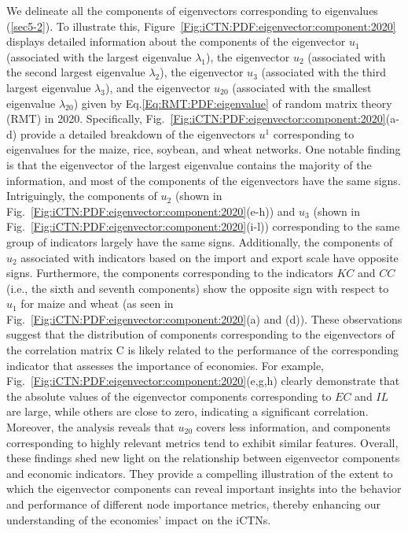 \documentclass[preprint,3p,times,sort&compress]{elsarticle}
\begin{document}
We delineate all the components of eigenvectors corresponding to eigenvalues (\ref{sec5-2}). To illustrate this, Figure~\ref{Fig:iCTN:PDF:eigenvector:component:2020} displays detailed information about the components of the eigenvector $u_1$ (associated with the largest eigenvalue $\lambda_1$), the eigenvector $u_2$ (associated with the second largest eigenvalue $\lambda_2$), the eigenvector $u_3$ (associated with the third largest eigenvalue $\lambda_3$), and the eigenvector $u_{20}$ (associated with the smallest eigenvalue $\lambda_{20}$) given by Eq.\ref{Eq:RMT:PDF:eigenvalue} of random matrix theory (RMT) in 2020. Specifically, Fig.~\ref{Fig:iCTN:PDF:eigenvector:component:2020}(a-d) provide a detailed breakdown of the eigenvectors $u^1$ corresponding to eigenvalues for the maize, rice, soybean, and wheat networks. One notable finding is that the eigenvector of the largest eigenvalue contains the majority of the information, and most of the components of the eigenvectors have the same signs. Intriguingly, the components of $u_2$ (shown in Fig.~\ref{Fig:iCTN:PDF:eigenvector:component:2020}(e-h)) and $u_3$ (shown in Fig.~\ref{Fig:iCTN:PDF:eigenvector:component:2020}(i-l)) corresponding to the same group of indicators largely have the same signs. Additionally, the components of $u_2$ associated with indicators based on the import and export scale have opposite signs. Furthermore, the components corresponding to the indicators $KC$ and $CC$ (i.e., the sixth and seventh components) show the opposite sign with respect to $u_1$ for maize and wheat (as seen in Fig.~\ref{Fig:iCTN:PDF:eigenvector:component:2020}(a) and (d)). These observations suggest that the distribution of components corresponding to the eigenvectors of the correlation matrix $\mathrm{C}$ is likely related to the performance of the corresponding indicator that assesses the importance of economies. For example, Fig.~\ref{Fig:iCTN:PDF:eigenvector:component:2020}(e,g,h) clearly demonstrate that the absolute values of the eigenvector components corresponding to $EC$ and $IL$ are large, while others are close to zero, indicating a significant correlation. Moreover, the analysis reveals that $u_{20}$ covers less information, and components corresponding to highly relevant metrics tend to exhibit similar features. Overall, these findings shed new light on the relationship between eigenvector components and economic indicators. They provide a compelling illustration of the extent to which the eigenvector components can reveal important insights into the behavior and performance of different node importance metrics, thereby enhancing our understanding of the economies' impact on the iCTNs.
\end{document}

